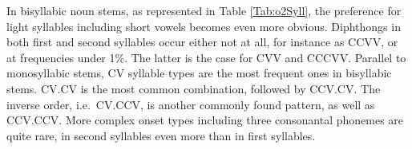 \noindent In bisyllabic noun stems, as represented in Table \ref{Tab:o2Syll}, the preference for light syllables including short vowels becomes even more obvious. Diphthongs in both first and second syllables occur either not at all, for instance as CCVV, or at frequencies under 1\%. The latter is the case for CVV and CCCVV. Parallel to monosyllabic stems, CV syllable types are the most frequent ones in bisyllabic stems. CV.CV is the most common combination, followed by CCV.CV. The inverse order, i.e.\ CV.CCV, is  another commonly found pattern, as well as CCV.CCV. More complex onset types including three consonantal phonemes are quite rare, in second syllables even more than in first syllables.

\begin{table} 
\centering
{}
\caption{Distribution of syllable types in bisyllabic noun stems}
\label{Tab:o2Syll}
\end{table}






